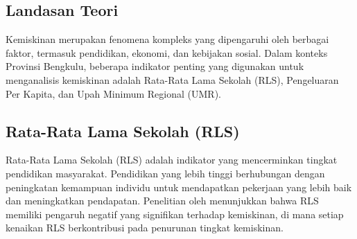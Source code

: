 \documentclass[12pt,a4paper]{article}
\begin{document}
\begin{multicols}{2}








\section{Landasan Teori}

Kemiskinan merupakan fenomena kompleks yang dipengaruhi oleh berbagai faktor, termasuk pendidikan, ekonomi, dan kebijakan sosial. Dalam konteks Provinsi Bengkulu, beberapa indikator penting yang digunakan untuk menganalisis kemiskinan adalah Rata-Rata Lama Sekolah (RLS), Pengeluaran Per Kapita, dan Upah Minimum Regional (UMR).

\subsection{Rata-Rata Lama Sekolah (RLS)}

Rata-Rata Lama Sekolah (RLS) adalah indikator yang mencerminkan tingkat pendidikan masyarakat. Pendidikan yang lebih tinggi berhubungan dengan peningkatan kemampuan individu untuk mendapatkan pekerjaan yang lebih baik dan meningkatkan pendapatan. Penelitian oleh \cite{pradipta2020pengaruh} menunjukkan bahwa RLS memiliki pengaruh negatif yang signifikan terhadap kemiskinan, di mana setiap kenaikan RLS berkontribusi pada penurunan tingkat kemiskinan.


\end{multicols}
\end{document}
